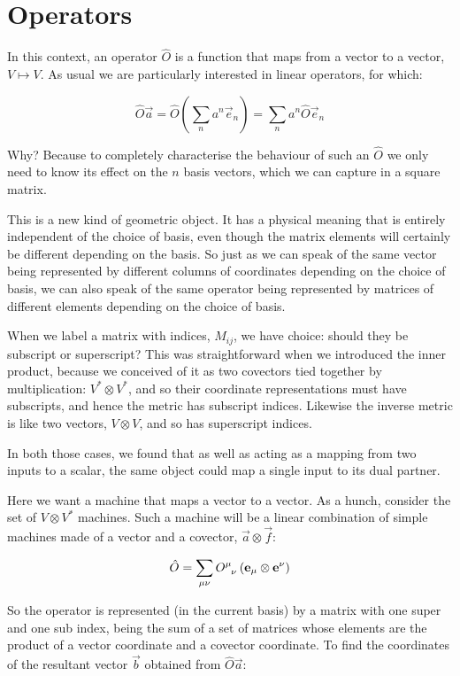 \section{Operators}

In this context, an operator $\hat{O}$ is a function that maps from a vector to a vector, $V \mapsto V$. As usual we are particularly interested in linear operators, for which:

$$
\hat{O} \vec{a}
=
\hat{O}\left(\sum_n a^n\vec{e}_n \right)
= 
\sum_n a^n\hat{O}\vec{e}_n
$$

Why? Because to completely characterise the behaviour of such an $\hat{O}$ we only need to know its effect on the $n$ basis vectors, which we can capture in a square matrix.

This is a new kind of geometric object. It has a physical meaning that is entirely independent of the choice of basis, even though the matrix elements will certainly be different depending on the basis. So just as we can speak of the same vector being represented by different columns of coordinates depending on the choice of basis, we can also speak of the same operator being represented by matrices of different elements depending on the choice of basis.

When we label a matrix with indices, $M_{ij}$, we have choice: should they be subscript or superscript? This was straightforward when we introduced the inner product, because we conceived of it as two covectors tied together by multiplication: $V^* \otimes V^*$, and so their coordinate representations must have subscripts, and hence the metric has subscript indices. Likewise the inverse metric is like two vectors, $V \otimes V$, and so has superscript indices.

In both those cases, we found that as well as acting as a mapping from two inputs to a scalar, the same object could map a single input to its dual partner.

Here we want a machine that maps a vector to a vector. As a hunch, consider the set of $V \otimes V^*$ machines. Such a machine will be a linear combination of simple machines made of a vector and a covector, $\vec{a} \otimes \vec{f}$:

\begin{equation}
\hat{O} = \sum_{\mu\nu} O\indices{^\mu_\nu} \left( \vec{e}_\mu \otimes \vec{e}^\nu \right)
\end{equation}

So the operator is represented (in the current basis) by a matrix with one super and one sub index, being the sum of a set of matrices whose elements are the product of a vector coordinate and a covector coordinate. To find the coordinates of the resultant vector $\vec{b}$ obtained from $\hat{O} \vec{a}$:

